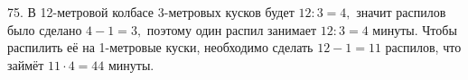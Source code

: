 75. В 12-метровой колбасе 3-метровых кусков будет $12:3=4,$ значит распилов было сделано $4-1=3,$ поэтому один распил занимает $12:3=4$ минуты. Чтобы распилить её на 1-метровые куски, необходимо сделать $12-1=11$ распилов, что займёт $11\cdot4=44$ минуты.\\
